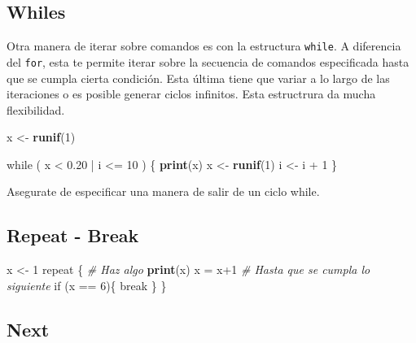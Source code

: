 \documentclass[]{article}
\newenvironment{Shaded}{\begin{snugshade}}{\end{snugshade}}
\newcommand{\KeywordTok}[1]{\textcolor[rgb]{0.13,0.29,0.53}{\textbf{{#1}}}}
\newcommand{\DecValTok}[1]{\textcolor[rgb]{0.00,0.00,0.81}{{#1}}}
\newcommand{\FloatTok}[1]{\textcolor[rgb]{0.00,0.00,0.81}{{#1}}}
\newcommand{\StringTok}[1]{\textcolor[rgb]{0.31,0.60,0.02}{{#1}}}
\newcommand{\CommentTok}[1]{\textcolor[rgb]{0.56,0.35,0.01}{\textit{{#1}}}}
\newcommand{\NormalTok}[1]{{#1}}
\begin{document}
\subsection{Whiles}\label{whiles}

Otra manera de iterar sobre comandos es con la estructura
\texttt{while}. A diferencia del \texttt{for}, esta te permite iterar
sobre la secuencia de comandos especificada hasta que se cumpla cierta
condición. Esta última tiene que variar a lo largo de las iteraciones o
es posible generar ciclos infinitos. Esta estructrura da mucha
flexibilidad.

\begin{Shaded}
\begin{Highlighting}[]
\NormalTok{x <-}\StringTok{ }\KeywordTok{runif}\NormalTok{(}\DecValTok{1}\NormalTok{)}

\NormalTok{while ( x <}\StringTok{ }\FloatTok{0.20} \NormalTok{|}\StringTok{ }\NormalTok{i <=}\StringTok{ }\DecValTok{10} \NormalTok{) \{}
  \KeywordTok{print}\NormalTok{(x)}
  \NormalTok{x <-}\StringTok{ }\KeywordTok{runif}\NormalTok{(}\DecValTok{1}\NormalTok{)}
  \NormalTok{i <-}\StringTok{ }\NormalTok{i +}\StringTok{ }\DecValTok{1}
\NormalTok{\}}
\end{Highlighting}
\end{Shaded}

\begin{nota}[Importante]
Asegurate de especificar una manera de salir de un ciclo while.
\end{nota}

\subsection{Repeat - Break}\label{repeat---break}

\begin{Shaded}
\begin{Highlighting}[]
\NormalTok{x <-}\StringTok{ }\DecValTok{1}
\NormalTok{repeat \{}
  \CommentTok{# Haz algo}
  \KeywordTok{print}\NormalTok{(x)}
  \NormalTok{x =}\StringTok{ }\NormalTok{x}\DecValTok{+1}
  \CommentTok{# Hasta que se cumpla lo siguiente}
  \NormalTok{if (x ==}\StringTok{ }\DecValTok{6}\NormalTok{)\{}
    \NormalTok{break}
  \NormalTok{\}}
\NormalTok{\}}
\end{Highlighting}
\end{Shaded}

\subsection{Next}\label{next}
\end{document}
